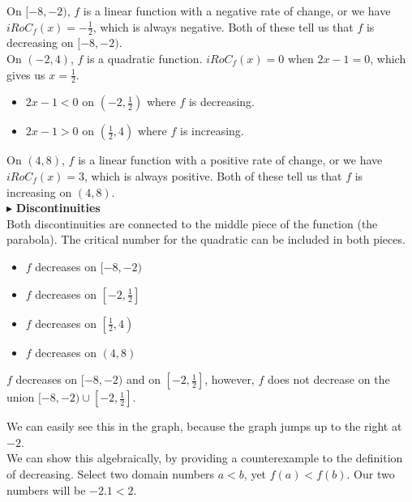 \documentclass{ximera}
\begin{document}
\begin{exercise}
\begin{question}
On $[-8, -2)$, $f$ is a linear function with a negative rate of change, or we have $iRoC_f(x) = -\frac{1}{2}$, which is always negative.  Both of these tell us that $f$ is decreasing on $[-8, -2)$. \\


On $(-2, 4)$, $f$ is a quadratic function.  $iRoC_f(x) = 0$ when $2x - 1 = 0$, which gives us $x = \frac{1}{2}$.


\begin{itemize}
\item $2x - 1 < 0$ on  $\left( -2, \frac{1}{2}  \right)$ where $f$ is decreasing.
\item $2x - 1 > 0$ on  $\left( \frac{1}{2}, 4 \right)$ where $f$ is increasing.
\end{itemize}

On $(4, 8)$, $f$ is a linear function with a positive rate of change, or we have $iRoC_f(x) = 3$, which is always positive.  Both of these tell us that $f$ is increasing on $(4, 8)$. \\




$\blacktriangleright$ \textbf{Discontinuities} \\


Both discontinuities are connected to the middle piece of the function (the parabola). The critical number for the quadratic can be included in both pieces.



\begin{itemize}
\item $f$ decreases on $[-8, -2)$
\item $f$ decreases on $\left[ -2, \frac{1}{2}  \right]$
\item $f$ decreases on $\left[ \frac{1}{2}, 4 \right)$
\item $f$ decreases on $(4, 8)$
\end{itemize}

\begin{warning}


$f$ decreases on $[-8, -2)$ and on $\left[ -2, \frac{1}{2}  \right]$, however, $f$ does not decrease on the union $[-8, -2) \cup \left[ -2, \frac{1}{2}  \right]$.

We can easily see this in the graph, because the graph jumps up to the right at $-2$. \\

We can show this algebraically, by providing a counterexample to the definition of decreasing. Select two domain numbers $a < b$, yet $f(a) < f(b)$.  Our two numbers will be $-2.1 < 2$.



\end{warning}
\end{question}
\end{exercise}
\end{document}
